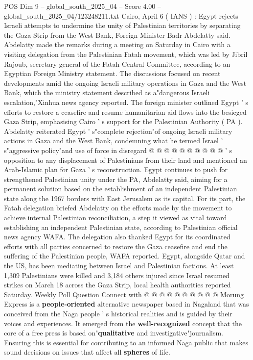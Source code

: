 \begin{textsample}{POS Dim 9 – global\_south\_2025\_04 – Score 4.00 – global\_south\_2025\_04/123248211.txt}  \label{ex:f9_pos_185}
Cairo, April 6 ( IANS ) : Egypt rejects Israeli attempts to undermine the unity of Palestinian territories by separating the Gaza Strip from the West Bank, Foreign Minister Badr Abdelatty said.
Abdelatty made the remarks during a meeting on Saturday in Cairo with a visiting delegation from the Palestinian Fatah movement, which was led by Jibril Rajoub, secretary-general of the Fatah Central Committee, according to an Egyptian Foreign Ministry statement.
The discussions focused on recent developments amid the ongoing Israeli military operations in Gaza and the West Bank, which the ministry statement described as a"dangerous Israeli escalation,"Xinhua news agency reported.
The foreign minister outlined Egypt ' s efforts to restore a ceasefire and resume humanitarian aid flows into the besieged Gaza Strip, emphasising Cairo ' s support for the Palestinian Authority ( PA ).
Abdelatty reiterated Egypt ' s"complete rejection"of ongoing Israeli military actions in Gaza and the West Bank, condemning what he termed Israel ' s"aggressive policy"and use of force in disregard @ @ @ @ @ @ @ @ @ @ ' s opposition to any displacement of Palestinians from their land and mentioned an Arab-Islamic plan for Gaza ' s reconstruction.
Egypt continues to push for strengthened Palestinian unity under the PA, Abdelatty said, aiming for a permanent solution based on the establishment of an independent Palestinian state along the 1967 borders with East Jerusalem as its capital.
For its part, the Fatah delegation briefed Abdelatty on the efforts made by the movement to achieve internal Palestinian reconciliation, a step it viewed as vital toward establishing an independent Palestinian state, according to Palestinian official news agency WAFA.
The delegation also thanked Egypt for its coordinated efforts with all parties concerned to restore the Gaza ceasefire and end the suffering of the Palestinian people, WAFA reported.
Egypt, alongside Qatar and the US, has been mediating between Israel and Palestinian factions.
At least 1,309 Palestinians were killed and 3,184 others injured since Israel resumed strikes on March 18 across the Gaza Strip, local health authorities reported Saturday.
Weekly Poll Question Connect with @ @ @ @ @ @ @ @ @ @ Morung Express is a \textbf{people-oriented} alternative newspaper based in Nagaland that was conceived from the Naga people ' s historical realities and is guided by their voices and experiences.
It emerged from the \textbf{well-recognized} concept that the core of a free press is based on"\textbf{qualitative} and investigative"journalism.
Ensuring this is essential for contributing to an informed Naga public that makes sound decisions on issues that affect all \textbf{spheres} of life.

\end{textsample}

